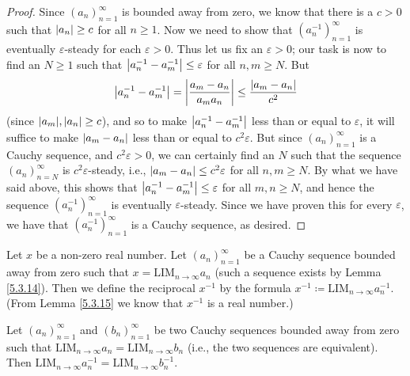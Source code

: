 \begin{proof}
    Since \((a_n)_{n = 1}^{\infty}\) is bounded away from zero, we know that there is a \(c > 0\) such that \(\abs*{a_n} \geq c\) for all \(n \geq 1\).
    Now we need to show that \((a_n^{-1})_{n = 1}^{\infty}\) is eventually \(\varepsilon\)-steady for each \(\varepsilon > 0\).
    Thus let us fix an \(\varepsilon > 0\);
    our task is now to find an \(N \geq 1\) such that \(\abs*{a_n^{-1} - a_m^{-1}} \leq \varepsilon\) for all \(n, m \geq N\).
    But
    \[
        \abs*{a_n^{-1} - a_m^{-1}} = \abs*{\frac{a_m - a_n}{a_m a_n}} \leq \frac{\abs*{a_m - a_n}}{c^2}
    \]
    (since \(\abs*{a_m}, \abs*{a_n} \geq c\)), and so to make \(\abs*{a_n^{-1} - a_m^{-1}}\) less than or equal to \(\varepsilon\), it will suffice to make \(\abs*{a_m - a_n}\) less than or equal to \(c^2 \varepsilon\).
    But since \((a_n)_{n = 1}^{\infty}\) is a Cauchy sequence, and \(c^2 \varepsilon > 0\), we can certainly find an \(N\) such that the sequence \((a_n)_{n = N}^{\infty}\) is \(c^2 \varepsilon\)-steady, i.e., \(\abs*{a_m - a_n} \leq c^2 \varepsilon\) for all \(n, m \geq N\).
    By what we have said above, this shows that \(\abs*{a_n^{-1} - a_m^{-1}} \leq \varepsilon\) for all \(m, n \geq N\), and hence the sequence \((a_n^{-1})_{n = 1}^{\infty}\) is eventually \(\varepsilon\)-steady.
    Since we have proven this for every \(\varepsilon\), we have that \((a_n^{-1})_{n = 1}^{\infty}\) is a Cauchy sequence, as desired.
\end{proof}

\begin{definition}\label{5.3.16}
    Let \(x\) be a non-zero real number.
    Let \((a_n)_{n = 1}^{\infty}\) be a Cauchy sequence bounded away from zero such that \(x = \text{LIM}_{n \to \infty} a_n\) (such a sequence exists by Lemma \ref{5.3.14}).
    Then we define the reciprocal \(x^{-1}\) by the formula \(x^{-1} \coloneqq \text{LIM}_{n \to \infty} a_n^{-1}\).
    (From Lemma \ref{5.3.15} we know that \(x^{-1}\) is a real number.)
\end{definition}

\begin{lemma}\label{5.3.17}
    Let \((a_n)_{n = 1}^{\infty}\) and \((b_n)_{n = 1}^{\infty}\) be two Cauchy sequences bounded away from zero such that \(\text{LIM}_{n \to \infty} a_n = \text{LIM}_{n \to \infty} b_n\) (i.e., the two sequences are equivalent).
    Then \(\text{LIM}_{n \to \infty} a_n^{-1} = \text{LIM}_{n \to \infty} b_n^{-1}\).
\end{lemma}

